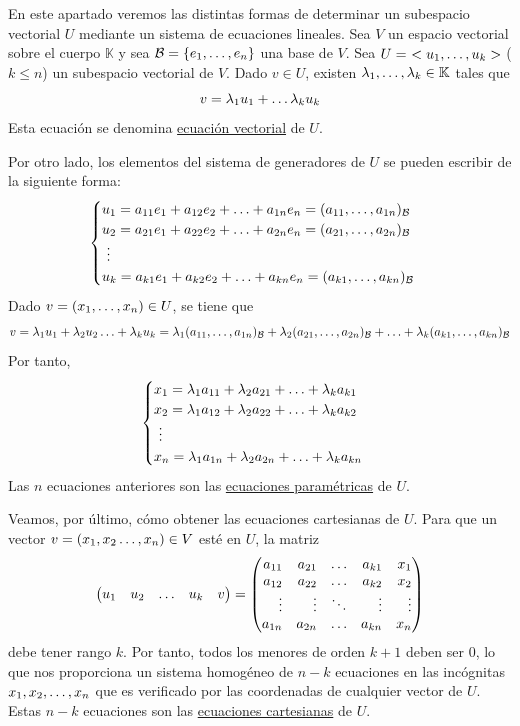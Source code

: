 \documentclass[12pt]{report}
\theoremstyle{definition}
\theoremstyle{definition}
\theoremstyle{remark}
\begin{document}
En este apartado veremos las distintas formas de determinar un subespacio vectorial $U$ mediante un sistema de ecuaciones lineales. Sea $V$ un espacio vectorial sobre el cuerpo $\mathbb K$ y sea $\mathcal{B} = \{e_1,\mathellipsis,e_n\}$ una base de $V$. Sea $U =\ <u_1,\mathellipsis,u_k>$ ($k \leq n$) un subespacio vectorial de $V$. Dado $v \in U$, existen $\lambda_1,\mathellipsis,\lambda_k \in \mathbb K$ tales que
\[v = \lambda_1 u_1+\mathellipsis \lambda_k u_k\]
Esta ecuación se denomina \ul{ecuación vectorial} de $U$.

\vspace{2mm}
Por otro lado, los elementos del sistema de generadores de $U$ se pueden escribir de la siguiente forma:
\[
\begin{cases}
    u_1 = a_{11}e_1+a_{12}e_2+\mathellipsis+a_{1n}e_n = (a_{11},\mathellipsis,a_{1n})_{\mathcal{B}}\\
    u_2 = a_{21}e_1+a_{22}e_2+\mathellipsis+a_{2n}e_n = (a_{21},\mathellipsis,a_{2n})_{\mathcal{B}}\\
   \ \vdots \\
    u_k = a_{k1}e_1+a_{k2}e_2+\mathellipsis+a_{kn}e_n = (a_{k1},\mathellipsis,a_{kn})_{\mathcal{B}}
\end{cases}
\]
Dado $v =(x_1,\mathellipsis,x_n) \in U$, se tiene que
\[v = \lambda_1u_1 + \lambda_2u_2 \mathellipsis + \lambda_ku_k = \lambda_1(a_{11},\mathellipsis,a_{1n})_{\mathcal{B}} +\lambda_2(a_{21},\mathellipsis,a_{2n})_{\mathcal{B}} +\mathellipsis +\lambda_k(a_{k1},\mathellipsis,a_{kn})_{\mathcal{B}}\]
Por tanto,
\[
\begin{cases}
    x_1 = \lambda_1a_{11}+\lambda_2a_{21}+\mathellipsis+\lambda_ka_{k1} \\
    x_2 = \lambda_1a_{12}+\lambda_2a_{22}+\mathellipsis+\lambda_ka_{k2} \\
    \ \vdots \\
    x_n=\lambda_1a_{1n}+\lambda_2a_{2n}+\mathellipsis+\lambda_ka_{kn}
\end{cases}
\]
Las $n$ ecuaciones anteriores son las \ul{ecuaciones paramétricas} de $U$.

\vspace{2mm}
Veamos, por último, cómo obtener las ecuaciones cartesianas de $U$. Para que un vector $v = (x_1,x_2\mathellipsis,x_n)\in V$ esté en $U$, la matriz
\[
\begin{pmatrix*}[r]
u_1 & u_2 & \mathellipsis & u_k & v
\end{pmatrix*}
=
\begin{pmatrix*}[r]
a_{11} & a_{21} & \mathellipsis & a_{k1} & x_1 \\
a_{12} & a_{22} & \mathellipsis & a_{k2} & x_2 \\
\vdots & \vdots & \ddots & \vdots & \vdots \\
a_{1n} & a_{2n} & \mathellipsis & a_{kn} & x_n
\end{pmatrix*}
\]
debe tener rango $k$. Por tanto, todos los menores de orden $k+1$ deben ser $0$, lo que nos proporciona un sistema homogéneo de $n-k$ ecuaciones en las incógnitas $x_1,x_2,\mathellipsis,x_n$ que es verificado por las coordenadas de cualquier vector de $U$. Estas $n-k$ ecuaciones son las \ul{ecuaciones cartesianas} de $U$.
\end{document}
